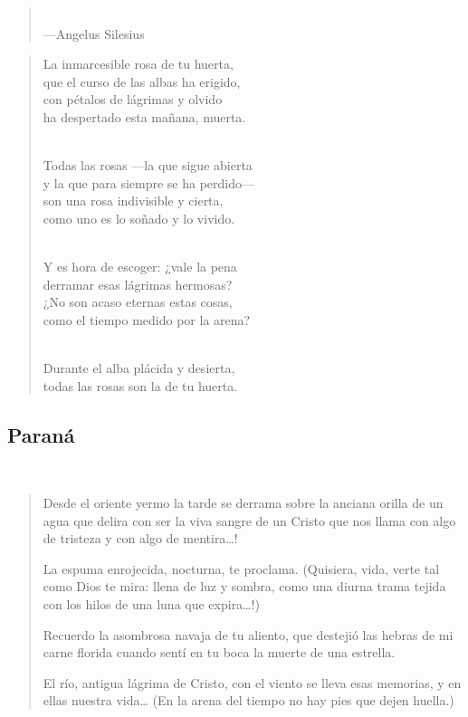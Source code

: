 \documentclass[a4paper, 12pt]{article}
\begin{document}
\begin{quote}
   
\scriptsize
{}\\
\hspace*{\fill}—Angelus Silesius
\end{quote}
\normalsize
\begin{verse}
    

La inmarcesible rosa de tu huerta,\\
que el curso de las albas ha erigido,\\
con pétalos de lágrimas y olvido\\
ha despertado esta mañana, muerta.\\
~ 

Todas las rosas —la que sigue abierta\\
y la que para siempre se ha perdido—\\
son una rosa indivisible y cierta,\\
como uno es lo soñado y lo vivido.\\
~ 

Y es hora de escoger: ¿vale la pena\\
derramar esas lágrimas hermosas?\\
¿No son acaso eternas estas cosas,\\
como el tiempo medido por la arena?\\
~ 

Durante el alba plácida y desierta,\\
todas las rosas son la de tu huerta.\\

\end{verse}

\pagebreak 
\subsection{Paraná}
~ 

\begin{verse}
Desde el oriente yermo la tarde se derrama
sobre la anciana orilla de un agua que delira
con ser la viva sangre de un Cristo que nos llama
con algo de tristeza y con algo de mentira…!

La espuma enrojecida, nocturna, te proclama.
(Quisiera, vida, verte tal como Dios te mira:
llena de luz y sombra, como una diurna trama
tejida con los hilos de una luna que expira…!)

Recuerdo la asombrosa navaja de tu aliento,
que destejió las hebras de mi carne florida
cuando sentí en tu boca la muerte de una estrella.

El río, antigua lágrima de Cristo, con el viento
se lleva esas memorias, y en ellas nuestra vida…
(En la arena del tiempo no hay pies que dejen huella.)
\end{verse}
\end{document}
